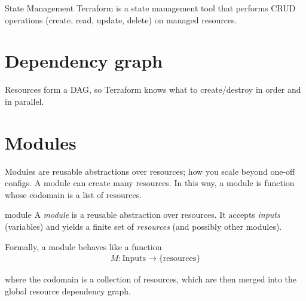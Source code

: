 \documentclass[openany, 12pt]{book}
\begin{document}
\begin{definition}{State Management}{}
	Terraform is a state management tool that performs CRUD operations (create,
	read, update, delete) on managed resources.
\end{definition}

\chapter{Dependency graph}
Resources form a DAG, so Terraform knows what to create/destroy in order and in
parallel.

\chapter{Modules}
Modules are reusable abstractions over resources; how you scale beyond one-off configs.
A module can create many resources. In this way, a module is function whose
codomain is a list of resources.

\begin{definition}{module}{}
	A \emph{module} is a reusable abstraction over resources. It accepts
	\emph{inputs} (variables) and yields a finite set of \emph{resources}
	(and possibly other modules).

	Formally, a module behaves like a function
	\begin{align*}
		M : \text{Inputs} \to \{\text{resources}\}
	\end{align*}

	where the codomain is a collection of resources, which are then merged
	into the global resource dependency graph.
\end{definition}
\end{document}
